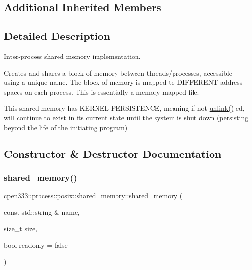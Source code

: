 \subsection*{Additional Inherited Members}


\subsection{Detailed Description}
Inter-\/process shared memory implementation. 

Creates and shares a block of memory between threads/processes, accessible using a unique name. The block of memory is mapped to D\+I\+F\+F\+E\+R\+E\+NT address spaces on each process. This is essentially a memory-\/mapped file.

This shared memory has K\+E\+R\+N\+EL P\+E\+R\+S\+I\+S\+T\+E\+N\+CE, meaning if not \hyperlink{classcpen333_1_1process_1_1posix_1_1shared__memory_a3b6d67a41cfaca3712d87958682d8bbe}{unlink()}-\/ed, will continue to exist in its current state until the system is shut down (persisting beyond the life of the initiating program) 

\subsection{Constructor \& Destructor Documentation}
\mbox{\label{classcpen333_1_1process_1_1posix_1_1shared__memory_a8a8f0918f8e132e0369c6e9ca9aa6bb6}} 
\subsubsection{\texorpdfstring{shared\+\_\+memory()}{shared\_memory()}}
{\footnotesize\ttfamily cpen333\+::process\+::posix\+::shared\+\_\+memory\+::shared\+\_\+memory (\begin{DoxyParamCaption}\item[{const std\+::string \&}]{name,  }\item[{size\+\_\+t}]{size,  }\item[{bool}]{readonly = {\ttfamily false} }\end{DoxyParamCaption})\hspace{0.3cm}{\ttfamily [inline]}}



